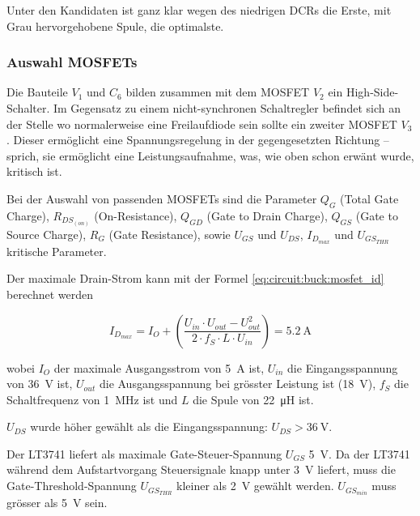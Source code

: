 Unter den Kandidaten ist ganz klar wegen des niedrigen DCRs die Erste,  mit Grau
hervorgehobene Spule, die optimalste.

\subsubsection{Auswahl MOSFETs}

Die  Bauteile  $V_1$  und  $C_6$  bilden  zusammen  mit  dem  MOSFET  $V_2$  ein
High-Side-Schalter. Im Gegensatz zu einem nicht-synchronen Schaltregler befindet
sich  an  der Stelle wo normalerweise eine Freilaufdiode sein sollte ein zweiter
MOSFET $V_3$. Dieser erm\"oglicht  eine  Spannungsregelung in der gegengesetzten
Richtung -- sprich, sie erm\"oglicht eine Leistungsaufnahme, was, wie oben schon
erw\"ant wurde, kritisch ist.

Bei  der  Auswahl von passenden MOSFETs sind die  Parameter  $Q_G$  (Total  Gate
Charge),  $R_{DS_{(on)}}$  (On-Resistance),  $Q_{GD}$  (Gate to  Drain  Charge),
$Q_{GS}$ (Gate to Source  Charge),  $R_G$  (Gate Resistance), sowie $U_{GS}$ und
$U_{DS}$, $I_{D_{max}}$ und $U_{GS_{THR}}$ kritische Parameter.

Der  maximale  Drain-Strom  kann mit der Formel  \ref{eq:circuit:buck:mosfet_id}
berechnet werden

\begin{equation}
    I_{D_{max}} = I_O + \left( \frac{U_{in} \cdot U_{out} - U_{out}^2}{2 \cdot f_S \cdot L \cdot U_{in}} \right) = \SI{5.2}{\ampere}
    \label{eq:circuit:buck:mosfet_id}
\end{equation}

wobei $I_O$ der maximale Ausgangsstrom  von  \SI{5}{\ampere}  ist,  $U_{in}$ die
Eingangsspannung von  \SI{36}{\volt}  ist,  $U_{out}$  die  Ausgangsspannung bei
gr\"osster  Leistung  ist   (\SI{18}{\volt}),   $f_S$   die  Schaltfrequenz  von
\SI{1}{\mega\hertz}  ist  und  $L$  die  Spule  von  \SI{22}{\micro\henry}  ist.

$U_{DS}$   wurde   h\"oher  gew\"ahlt  als  die  Eingangsspannung:   $U_{DS}   >
\SI{36}{\volt}$.

Der LT3741 liefert als maximale Gate-Steuer-Spannung $U_{GS}$  \SI{5}{\volt}. Da
der LT3741 w\"ahrend dem Aufstartvorgang Steuersignale knapp unter \SI{3}{\volt}
liefert,   muss   die   Gate-Threshold-Spannung   $U_{GS_{THR}}$   kleiner   als
\SI{2}{\volt} gew\"ahlt werden. $U_{GS_{min}}$ muss gr\"osser  als \SI{5}{\volt}
sein.


